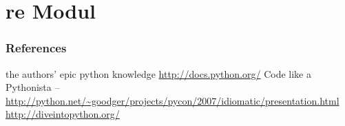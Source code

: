 \documentclass{beamer}
\begin{document}
\section{re Modul}


\begin{frame}
	\frametitle{References}
	\begin{thebibliography}{3}
	 the authors' epic python knowledge
	 \url{http://docs.python.org/}
	 Code like a Pythonista -- \url{http://python.net/~goodger/projects/pycon/2007/idiomatic/presentation.html}
	 \url{http://diveintopython.org/}
	\end{thebibliography}
\end{frame}
\end{document}
